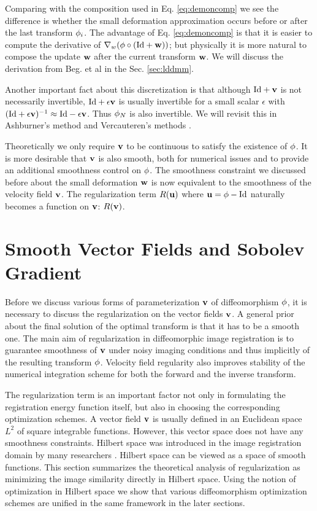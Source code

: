 \documentclass[letterpaper,12pt]{article}
\begin{document}
Comparing with the composition used in Eq. \ref{eq:demoncomp} we see
the difference is whether the small deformation approximation occurs before or after the last transform $\phi_i$. The advantage of Eq. \ref{eq:demoncomp} is that it is easier to compute the derivative of $\nabla_w(\phi \circ (\text{Id} + \mathbf{w})) $; but physically it is more natural to compose the update $\mathbf{w}$ after the current transform $\mathbf{w}$. We will discuss the derivation from Beg. et al \cite{Beg2005Computing} in the Sec. \ref{sec:lddmm}.

Another important fact about this discretization is that although $\text{Id} + \mathbf{v}$ is not necessarily invertible, $\text{Id} + \epsilon \mathbf{v}$ is usually invertible for a small scalar $\epsilon$ with $(\text{Id} + \epsilon \mathbf{v})^{-1} \approx \text{Id} - \epsilon \mathbf{v}$. Thus $\phi_N$ is also invertible. We will revisit this in Ashburner's method \cite{Ashburner2007} and Vercauteren's methods \cite{Vercauteren2009, Vercauteren2008Symmetric}.
 
Theoretically we only require $\mathbf{v}$ to be continuous to satisfy the
existence of $\phi$. It is more desirable that $\mathbf{v}$ is also smooth,
both for numerical issues and to provide an additional smoothness
control on $\phi$. The smoothness constraint we discussed before about the small deformation $\mathbf{w}$ is now equivalent to the smoothness of the velocity field $\mathbf{v}$. The regularization term $R(\mathbf{u})$ where $\mathbf{u} = \phi - \text{Id}$ naturally becomes a function on $\mathbf{v}$: $R(\mathbf{v})$.



\section{Smooth Vector Fields and Sobolev Gradient}

Before we discuss various forms of parameterization $\mathbf{v}$ of
diffeomorphism $\phi$, it is necessary to discuss the regularization
on the vector fields $\mathbf{v}$. A general prior about the final solution of
the optimal transform is that it has to be a smooth one. The main aim
of regularization in diffeomorphic image registration is to guarantee
smoothness of $\mathbf{v}$ under noisy imaging conditions and thus implicitly
of the resulting transform $\phi$.  Velocity field regularity also
improves stability of the numerical integration scheme for both the
forward and the inverse transform. 

The regularization term is an important factor not only in formulating
the registration energy function itself, but  also in choosing the
corresponding optimization schemes. A vector field $\mathbf{v}$ is usually
defined in an Euclidean space $L^2$ of square integrable
functions. However, this vector space does not have any smoothness
constraints. Hilbert space was introduced in the image registration domain by many researchers \cite{Trouve1998, Beg2005Computing, Hernandez2008, Zikic2010}. Hilbert space can be viewed as a space of smooth functions. This section summarizes the theoretical analysis of regularization as minimizing the image similarity directly in Hilbert space. Using the notion of optimization in Hilbert space we show that various diffeomorphism optimization schemes are unified in the same framework in the later sections.
\end{document}
